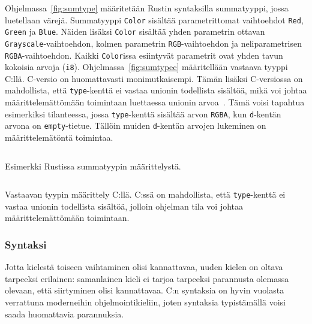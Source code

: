 Ohjelmassa~\ref{fig:sumtype} määritetään Rustin syntaksilla summatyyppi, jossa
luetellaan värejä. Summatyyppi \texttt{Color} sisältää parametrittomat
vaihtoehdot \texttt{Red}, \texttt{Green} ja \texttt{Blue}. Näiden lisäksi
\texttt{Color} sisältää yhden parametrin ottavan
\texttt{Grayscale}-vaihtoehdon, kolmen parametrin \texttt{RGB}-vaihtoehdon ja
neliparametrisen \texttt{RGBA}-vaihtoehdon. Kaikki \texttt{Color}issa
esiintyvät parametrit ovat yhden tavun kokoisia arvoja (\texttt{i8}).
Ohjelmassa~\ref{fig:sumtypec} määritellään vastaava tyyppi C:llä. C-versio on
huomattavasti monimutkaisempi. Tämän lisäksi C-versiossa on mahdollista, että
\texttt{type}-kenttä ei vastaa unionin todellista sisältöä, mikä voi johtaa
määrittelemättömään toimintaan luettaessa unionin arvoa~\citep[luku
6.7.2.1]{C18}. Tämä voisi tapahtua esimerkiksi tilanteessa, jossa
\texttt{type}-kenttä sisältää arvon \texttt{RGBA}, kun \texttt{d}-kentän arvona
on \texttt{empty}-tietue. Tällöin muiden \texttt{d}-kentän arvojen lukeminen on
määrittelemätöntä toimintaa.

\FloatBarrier

\begin{listing}[ht!]
    \inputminted{Rust}{sumtype.rs}
    \caption{Esimerkki Rustissa summatyypin määrittelystä.}
    \label{fig:sumtype}
\end{listing}

\FloatBarrier

\begin{listing}[ht!]
    \inputminted{C}{sumtype.c}
    \caption{Vastaavan tyypin määrittely C:llä. C:ssä on mahdollista, että
    \texttt{type}-kenttä ei vastaa unionin todellista sisältöä, jolloin
    ohjelman tila voi johtaa määrittelemättömään toimintaan.}
    \label{fig:sumtypec}
\end{listing}

\FloatBarrier


\subsubsection{Syntaksi}

Jotta kielestä toiseen vaihtaminen olisi kannattavaa, uuden kielen on oltava
tarpeeksi erilainen: samanlainen kieli ei tarjoa tarpeeksi parannusta
olemassa olevaan, että siirtyminen olisi kannattavaa. C:n syntaksia on hyvin
vuolasta verrattuna moderneihin ohjelmointikieliin, joten syntaksia
typistämällä voisi saada huomattavia parannuksia.

%


